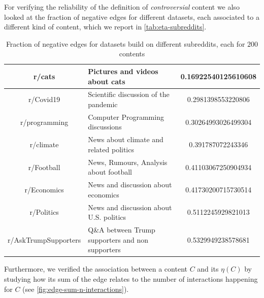 For verifying the reliability of the definition of \emph{controversial} content
we also looked at the fraction of negative edges for different datasets, each
associated to a different kind of content, which we report in
\autoref{tab:eta-subreddits}.

\begin{table}
	\centering
	\caption[Fraction of negative edges in different subreddits]{Fraction of negative edges for datasets build on different
		subreddits, each for $200$ contents}
	\label{tab:eta-subreddits}
	{\small
		\begin{tabular}{c | p{6cm} | c}
			r/cats               & Pictures and videos about cats                & \num{0.16922540125610608} \\
			\hline
			r/Covid19            & Scientific discussion of the pandemic         & \num{0.2981398553220806}  \\
			\hline
			r/programming        & Computer Programming discussions              & \num{0.30264993026499304} \\
			\hline
			r/climate            & News about climate and related politics       & \num{0.391787072243346}   \\
			\hline
			r/Football           & News, Rumours, Analysis about \mbox{football} & \num{0.41103067250904934} \\
			\hline
			r/Economics          & News and discussion about economics           & \num{0.41730200715730514} \\
			\hline
			r/Politics           & News and discussion about U.S. politics       & \num{0.5112245929821013}  \\
			\hline
			r/AskTrumpSupporters & {Q\&A between Trump supporters and non
			supporters}          & \num{0.5329949238578681}                                                  \\
		\end{tabular}
	}
\end{table}

Furthermore, we verified the association between a content $C$ and its
$\eta(C)$ by studying how its sum of the edge relates to the number of
interactions happening for $C$ (see \autoref{fig:edge-sum-n-interactions}).

